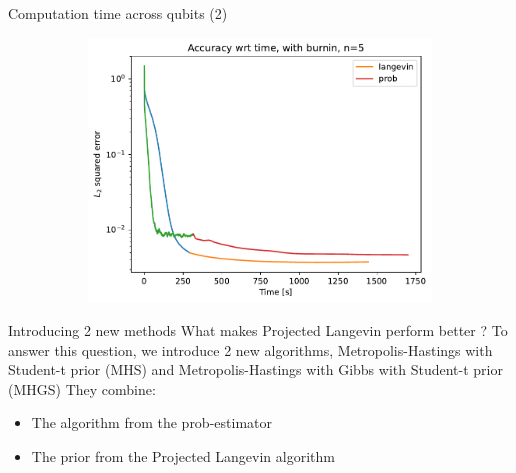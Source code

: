 \documentclass{beamer}
\begin{document}
\begin{frame}{Computation time across qubits (2)}
\begin{figure}[H]
\begin{subfigure}[b]{0.4\textwidth}
            
            \includegraphics[width=\linewidth]{figures/experiments/baseline/diff_n_qubits/iters_acc_comp_time_no_avg_n5-1.png}
        \end{subfigure}
            \quad
            \begin{minipage}[b]{.1\textwidth}
            \end{minipage}
            \hspace*{\fill}
        \label{fig:conv-plot-diff-n}
    
    \end{figure}
\end{frame}

\begin{frame}{Introducing 2 new methods}
    What makes Projected Langevin perform better ?\medbreak
    To answer this question, we introduce 2 new algorithms, Metropolis-Hastings with Student-t prior (MHS) and Metropolis-Hastings with Gibbs with Student-t prior (MHGS)\medbreak
    They combine:
    \begin{itemize}
        \item The algorithm from the prob-estimator
        \item The prior from the Projected Langevin algorithm
    \end{itemize}
\end{frame}
\end{document}
